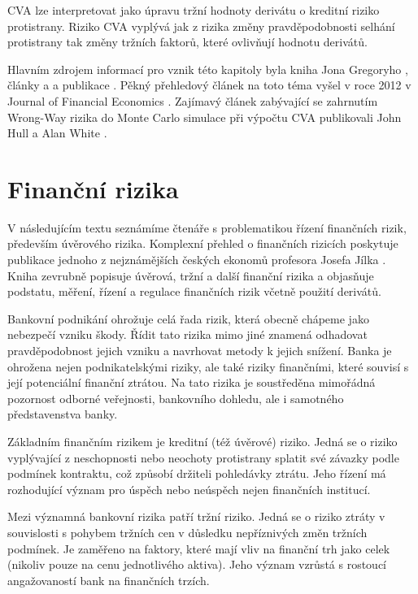 \documentclass[a4paper,12pt]{report}
\theoremstyle{definition} \newtheorem{definice}[veta]{Definice}
\theoremstyle{remark}
\begin{document}
CVA lze interpretovat jako úpravu tržní hodnoty derivátu o kreditní riziko protistrany.
Riziko CVA vyplývá jak z rizika změny pravděpodobnosti selhání protistrany tak změny tržních faktorů, které ovlivňují hodnotu derivátů.

Hlavním zdrojem informací pro vznik této kapitoly byla kniha Jona Gregoryho \cite{gregory2010},
články \cite{zhu2007} a \cite{pykhtin2010} a publikace \cite{brigo2014}.
Pěkný přehledový článek na toto téma vyšel v roce 2012 v Journal of Financial Economics \cite{arora2012}.
Zajímavý článek zabývající se zahrnutím Wrong-Way rizika do Monte Carlo simulace při výpočtu CVA publikovali John Hull a Alan White \cite{hull2012cva}.



\section{Finanční rizika}
V následujícím textu seznámíme čtenáře s problematikou řízení finančních rizik, především úvěrového rizika.
Komplexní přehled o finančních rizicích poskytuje publikace  jednoho z nejznámějších českých ekonomů profesora Josefa Jílka \cite{jilek2000}.
Kniha zevrubně popisuje úvěrová, tržní a další finanční rizika a objasňuje podstatu, měření, řízení a regulace finančních rizik včetně použití derivátů.

Bankovní podnikání ohrožuje celá řada rizik, která obecně chápeme jako nebezpečí vzniku škody. 
Řídit tato rizika mimo jiné znamená odhadovat pravděpodobnost jejich vzniku a navrhovat metody k jejich snížení.
Banka je ohrožena nejen podnikatelskými riziky, ale také riziky finančními, které souvisí s její potenciální finanční ztrátou. 
Na tato rizika je soustředěna mimořádná pozornost odborné veřejnosti, bankovního dohledu, ale i samotného představenstva banky.

Základním finančním rizikem je kreditní (též úvěrové) riziko.
Jedná se o riziko vyplývající z neschopnosti nebo neochoty protistrany splatit své závazky podle podmínek
kontraktu, což způsobí držiteli pohledávky ztrátu.
Jeho řízení má rozhodující význam pro úspěch nebo neúspěch nejen finančních institucí. 

Mezi významná bankovní rizika patří tržní riziko. 
Jedná se o riziko ztráty v souvislosti s pohybem tržních cen v důsledku nepříznivých změn tržních podmínek. 
Je zaměřeno na faktory, které mají vliv na finanční trh jako celek (nikoliv pouze na cenu jednotlivého aktiva).
Jeho význam vzrůstá s rostoucí angažovaností bank na finančních trzích. 
\end{document}
